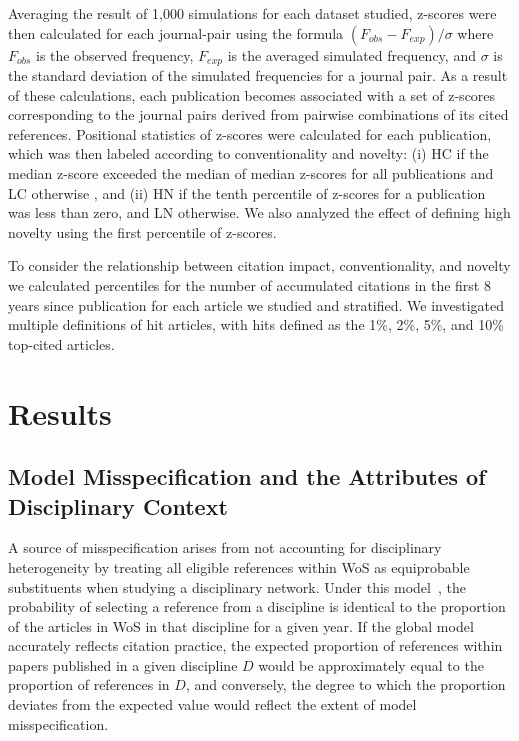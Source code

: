 \documentclass[NETN]{stjour}
\begin{document}
Averaging the result of 1,000 simulations for each dataset studied, z-scores were then calculated for each journal-pair using the formula $(F_{obs} - F_{exp})/\sigma$ where $F_{obs}$ is the observed frequency, $F_{exp}$ is the averaged simulated frequency, and $\sigma$ is the standard deviation of the simulated frequencies for a journal pair. As a result of these calculations, each publication becomes associated with a set of z-scores corresponding to the journal pairs derived from pairwise combinations of its cited references. Positional statistics of z-scores were calculated for each publication, which was then labeled according to conventionality and novelty: (i) HC if the median z-score exceeded the median of median z-scores for all publications and LC otherwise
, and (ii) HN if the tenth percentile of z-scores for a publication was less than zero, and LN otherwise. 
We also analyzed the effect of defining high novelty using the first percentile of z-scores.

To consider the relationship between citation impact, conventionality, and novelty we calculated percentiles for the number of accumulated citations in the first 8 years since publication for each article we studied and stratified. We investigated multiple definitions of hit articles, with hits defined as the 1\%, 2\%, 5\%, and 10\% top-cited articles.  

\section{Results}

\subsection{Model Misspecification and the Attributes of Disciplinary Context} 
A source of misspecification arises from not accounting for disciplinary heterogeneity by treating all eligible references within WoS as equiprobable substituents when studying a disciplinary network. Under this model~\citep{Uzzi}, the probability of selecting a reference from a discipline is identical to the proportion of the articles in WoS in that discipline for a given year.  If the global model accurately reflects citation practice, the expected proportion of references within papers published in a given discipline $D$ would be approximately equal to the proportion of references in  $D$, and conversely, the degree to which the proportion deviates from the expected value would reflect the extent of model misspecification. 
\end{document}
